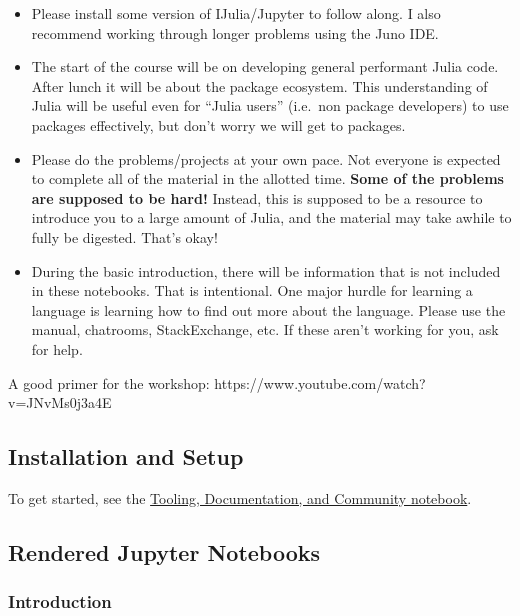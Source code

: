 \documentclass[11pt]{article}
\begin{document}
\begin{itemize}
\itemsep1pt\parskip0pt
\item
  Please install some version of IJulia/Jupyter to follow along. I also
  recommend working through longer problems using the Juno IDE.
\item
  The start of the course will be on developing general performant Julia
  code. After lunch it will be about the package ecosystem. This
  understanding of Julia will be useful even for ``Julia users''
  (i.e.~non package developers) to use packages effectively, but don't
  worry we will get to packages.
\item
  Please do the problems/projects at your own pace. Not everyone is
  expected to complete all of the material in the allotted time.
  \textbf{Some of the problems are supposed to be hard!} Instead, this
  is supposed to be a resource to introduce you to a large amount of
  Julia, and the material may take awhile to fully be digested. That's
  okay!
\item
  During the basic introduction, there will be information that is not
  included in these notebooks. That is intentional. One major hurdle for
  learning a language is learning how to find out more about the
  language. Please use the manual, chatrooms, StackExchange, etc. If
  these aren't working for you, ask for help.
\end{itemize}

A good primer for the workshop:
https://www.youtube.com/watch?v=JNvMs0j3a4E

    \subsection{Installation and Setup}\label{installation-and-setup}

To get started, see the
\href{http://ucidatascienceinitiative.github.io/IntroToJulia/Html/ToolingDocumentationCommunity}{Tooling,
Documentation, and Community notebook}.

    \subsection{Rendered Jupyter
Notebooks}\label{rendered-jupyter-notebooks}

\subsubsection{Introduction}\label{introduction}
\end{document}
